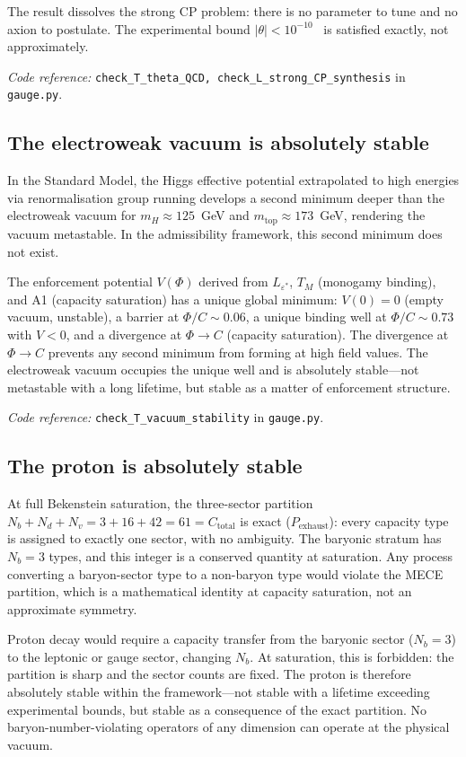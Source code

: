\documentclass[11pt]{article}
\newcommand{\coderef}[2]{\smallskip\noindent\textit{Code reference:} \texttt{#1} in \texttt{#2}.}
\begin{document}
The result dissolves the strong CP problem: there is no parameter to tune and no axion to postulate.  The experimental bound $|\theta| < 10^{-10}$~\cite{PDG2024} is satisfied exactly, not approximately.

\coderef{check\_T\_theta\_QCD, check\_L\_strong\_CP\_synthesis}{gauge.py}

\subsection{The electroweak vacuum is absolutely stable}
\label{sec:vacuum_stability}

In the Standard Model, the Higgs effective potential extrapolated to high energies via renormalisation group running develops a second minimum deeper than the electroweak vacuum for $m_H \approx 125$~GeV and $m_{\mathrm{top}} \approx 173$~GeV, rendering the vacuum metastable.  In the admissibility framework, this second minimum does not exist.

The enforcement potential $V(\Phi)$ derived from $L_{\varepsilon^*}$, $T_M$ (monogamy binding), and A1 (capacity saturation) has a unique global minimum: $V(0) = 0$ (empty vacuum, unstable), a barrier at $\Phi/C \sim 0.06$, a unique binding well at $\Phi/C \sim 0.73$ with $V < 0$, and a divergence at $\Phi \to C$ (capacity saturation).  The divergence at $\Phi \to C$ prevents any second minimum from forming at high field values.  The electroweak vacuum occupies the unique well and is absolutely stable---not metastable with a long lifetime, but stable as a matter of enforcement structure.

\coderef{check\_T\_vacuum\_stability}{gauge.py}

\subsection{The proton is absolutely stable}
\label{sec:proton_stability}

At full Bekenstein saturation, the three-sector partition $N_b + N_d + N_v = 3 + 16 + 42 = 61 = C_{\mathrm{total}}$ is exact ($P_{\mathrm{exhaust}}$): every capacity type is assigned to exactly one sector, with no ambiguity.  The baryonic stratum has $N_b = 3$ types, and this integer is a conserved quantity at saturation.  Any process converting a baryon-sector type to a non-baryon type would violate the MECE partition, which is a mathematical identity at capacity saturation, not an approximate symmetry.

Proton decay would require a capacity transfer from the baryonic sector ($N_b = 3$) to the leptonic or gauge sector, changing $N_b$.  At saturation, this is forbidden: the partition is sharp and the sector counts are fixed.  The proton is therefore absolutely stable within the framework---not stable with a lifetime exceeding experimental bounds, but stable as a consequence of the exact partition.  No baryon-number-violating operators of any dimension can operate at the physical vacuum.
\end{document}

